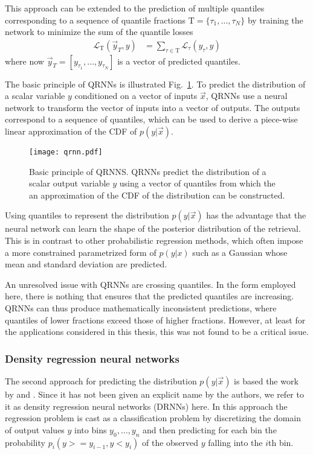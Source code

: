 This approach can be extended to the prediction of multiple quantiles
corresponding to a sequence of quantile fractions $\mathrm{T} = \{\tau_1,
\ldots, \tau_N\}$ by training the network to minimize the sum of the quantile
losses
\begin{align}
  \mathcal{L}_\mathrm{T}(\vec{y}_T, y) &= 
  \sum_{\tau \in \mathrm{T}} \mathcal{L}_\tau(y_\tau, y)
\end{align}
where now $\vec{y}_T = [y_{\tau_1}, \ldots, y_{\tau_N}]$ is a vector of predicted quantiles.

The basic principle of QRNNs is illustrated
Fig.~\ref{fig:machine_learning:qrnn}. To predict the distribution of a scalar
variable $y$ conditioned on a vector of inputs $\vec{x}$, QRNNs use a neural
network to transform the vector of inputs into a vector of outputs. The outputs
correspond to a sequence of quantiles, which can be used to derive a piece-wise
linear approximation of the CDF of $p(y|\vec{x})$.

\begin{figure}[btp]
  \centering
  \texttt{[image: qrnn.pdf]}
  \caption{Basic principle of QRNNS. QRNNs predict the distribution of
    a scalar output variable $y$ using a vector of quantiles from which the
    an approximation of the CDF of the distribution can be constructed.}
  \label{fig:machine_learning:qrnn}
\end{figure}

Using quantiles to represent the distribution $p(y|\vec{x})$ has the advantage
that the neural network can learn the shape of the posterior distribution of the
retrieval. This is in contrast to other probabilistic regression methods, which
often impose a more constrained parametrized form of $p(y|x)$ such as a Gaussian
whose mean and standard deviation are predicted.

An unresolved issue with QRNNs are crossing quantiles. In the form employed
here, there is nothing that ensures that the predicted quantiles are increasing.
QRNNs can thus produce mathematically inconsistent predictions, where quantiles
of lower fractions exceed those of higher fractions. However, at least
for the applications considered in this thesis, this was not found to be a
critical issue.

\subsubsection{Density regression neural networks}

The second approach for predicting the distribution $p(y|\vec{x})$ is based the work
by \citet{oord16} and \citet{sonderby20}. Since it has not been given an
explicit name by the authors, we refer to it as density regression neural
networks (DRNNs) here. In this approach the regression problem is cast as a
classification problem by discretizing the domain of output values $y$ into bins
$y_0, \ldots, y_n$ and then predicting for each bin the probability $p_i(y >=
y_{i - 1}, y < y_i)$ of the observed $y$ falling into the $i$th bin.


